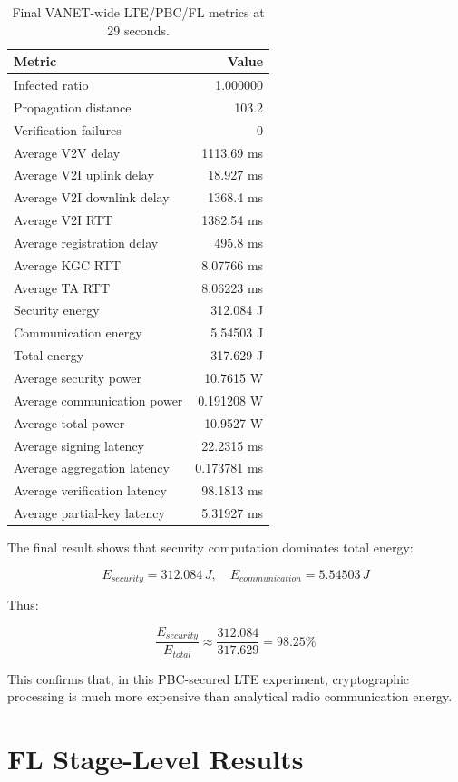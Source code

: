 \documentclass[11pt,a4paper]{article}
\begin{document}
\begin{table}[h]
\centering
\caption{Final VANET-wide LTE/PBC/FL metrics at 29 seconds.}
\label{tab:final-power}
\begin{tabular}{lr}
\toprule
\textbf{Metric} & \textbf{Value} \\
\midrule
Infected ratio & 1.000000 \\
Propagation distance & 103.2 \\
Verification failures & 0 \\
Average V2V delay & 1113.69 ms \\
Average V2I uplink delay & 18.927 ms \\
Average V2I downlink delay & 1368.4 ms \\
Average V2I RTT & 1382.54 ms \\
Average registration delay & 495.8 ms \\
Average KGC RTT & 8.07766 ms \\
Average TA RTT & 8.06223 ms \\
Security energy & 312.084 J \\
Communication energy & 5.54503 J \\
Total energy & 317.629 J \\
Average security power & 10.7615 W \\
Average communication power & 0.191208 W \\
Average total power & 10.9527 W \\
Average signing latency & 22.2315 ms \\
Average aggregation latency & 0.173781 ms \\
Average verification latency & 98.1813 ms \\
Average partial-key latency & 5.31927 ms \\
\bottomrule
\end{tabular}
\end{table}

The final result shows that security computation dominates total energy:

\[
E_{security}=312.084\,J,\quad E_{communication}=5.54503\,J
\]

Thus:

\[
\frac{E_{security}}{E_{total}}\approx
\frac{312.084}{317.629}=98.25\%
\]

This confirms that, in this PBC-secured LTE experiment, cryptographic processing
is much more expensive than analytical radio communication energy.

\section{FL Stage-Level Results}
\end{document}
